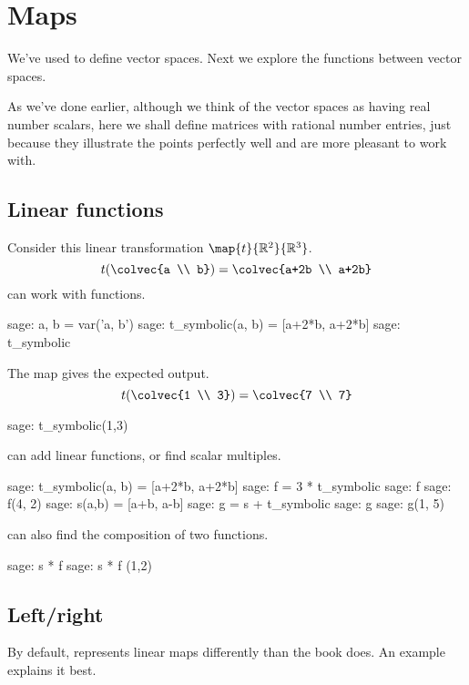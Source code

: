 \chapter{Maps}\label{chapter:maps}


We've used \Sage{} to define vector spaces.
Next we explore the functions between vector spaces.

As we've done earlier, although we think of the vector spaces 
as having real number scalars, here
we shall define matrices with rational number
entries, just because they illustrate the points perfectly well
and are more pleasant to work with.
  

\section{Linear functions} \label{sec:linearfunctions}
Consider
this linear transformation $\map{t}{\Re^2}{\Re^3}$.
\begin{equation*}
  t(\colvec{a \\ b})
  =\colvec{a+2b \\ a+2b}
\end{equation*}
\Sage{} can work with functions.
\begin{sagecommandline}
sage: a, b = var('a, b')   
sage: t_symbolic(a, b) = [a+2*b, a+2*b]         
sage: t_symbolic       
\end{sagecommandline}
The map gives the expected output.
\begin{equation*}
  t(\colvec{1 \\ 3})
  =\colvec{7 \\ 7}
\end{equation*}
\begin{sagecommandline}
sage: t_symbolic(1,3)       
\end{sagecommandline}

\Sage{} can add linear functions, or find scalar multiples.
\begin{sagecommandline}
sage: t_symbolic(a, b) = [a+2*b, a+2*b]         
sage: f = 3 * t_symbolic
sage: f
sage: f(4, 2)
sage: s(a,b) = [a+b, a-b]
sage: g = s + t_symbolic
sage: g
sage: g(1, 5) 
\end{sagecommandline}
\Sage{} can also find the composition of two functions.
\begin{sagecommandline}
sage: s * f
sage: s * f (1,2)
\end{sagecommandline}


\section{Left/right} \label{sec:leftright}
By default, \Sage{} represents linear
maps differently than the book does.
An example explains it best.




